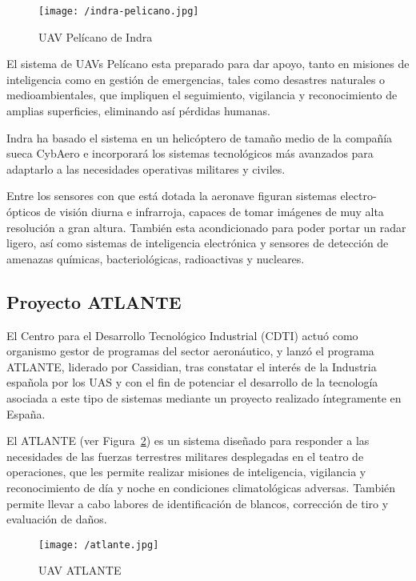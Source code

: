 \begin{figure}[!h]
\begin{center}
\texttt{[image: /indra-pelicano.jpg]}
\caption[\acs{UAV} Pelícano de Indra]{\acs{UAV} Pelícano de Indra}
\label{fig:pelicano}
\end{center}
\end{figure}

El sistema de \acs{UAV}s Pelícano \cite{PELICANO} esta preparado para dar apoyo, tanto en misiones de inteligencia como en gestión de emergencias, tales como 
desastres naturales o medioambientales, que impliquen el seguimiento, vigilancia y reconocimiento de amplias superficies, eliminando así pérdidas humanas.

Indra ha basado el sistema en un helicóptero de tamaño medio de la compañía sueca CybAero e incorporará los sistemas tecnológicos más avanzados para adaptarlo a las necesidades operativas militares y civiles. 

Entre los sensores con que está dotada la aeronave figuran sistemas electro-ópticos de visión diurna e infrarroja, capaces de tomar imágenes de muy alta resolución  a gran altura. También esta acondicionado para poder portar un radar ligero, así como sistemas de inteligencia electrónica y sensores de detección de amenazas químicas, bacteriológicas, radioactivas y nucleares.

\subsection{Proyecto ATLANTE}
\label{sec:atlante}

El Centro para el Desarrollo Tecnológico Industrial (CDTI) actuó como organismo gestor de programas del sector aeronáutico, y lanzó el programa \acs{ATLANTE}, liderado por Cassidian, tras constatar el interés de la Industria española por los \acs{UAS} y con el fin de potenciar el desarrollo de la tecnología asociada a este tipo de sistemas mediante un proyecto realizado íntegramente en España.

El \acs{ATLANTE} (ver Figura~\ref{fig:atlante}) es un sistema diseñado para responder a las necesidades de las fuerzas terrestres militares desplegadas en el teatro de operaciones, que les permite realizar misiones de inteligencia, vigilancia y reconocimiento de día y noche en condiciones climatológicas adversas. También permite llevar a cabo labores de identificación de blancos, corrección de tiro y evaluación de daños.

\begin{figure}[!h]
\begin{center}
\texttt{[image: /atlante.jpg]}
\caption[\acs{UAV} \acs{ATLANTE}]{\acs{UAV} \acs{ATLANTE}}
\label{fig:atlante}
\end{center}
\end{figure}

